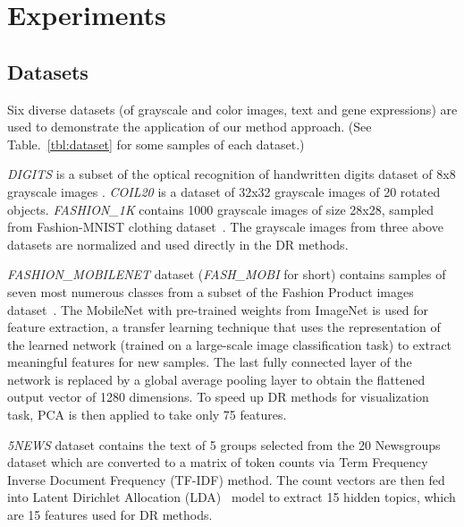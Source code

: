 \section{Experiments}\label{sec:xp:setup}


\subsection{Datasets}\label{sec:xp:data}

Six diverse datasets (of grayscale and color images, text and gene expressions) are used to demonstrate the application of our method approach. (See Table.~\ref{tbl:dataset} for some samples of each dataset.)

\emph{DIGITS} is a subset of the optical recognition of handwritten digits dataset of 8x8 grayscale images \cite{kaynak1995methods}.
\emph{COIL20} \cite{nene1996} is a dataset of 32x32 grayscale images of 20 rotated objects.
\emph{FASHION\_1K} contains 1000 grayscale images of size 28x28, sampled from Fashion-MNIST clothing dataset~\cite{xiao2017/online}.
The grayscale images from three above datasets are normalized and used directly in the DR methods.

\emph{FASHION\_MOBILENET} dataset (\emph{FASH\_MOBI} for short) contains samples of seven most numerous classes from a subset of the Fashion Product images dataset~\cite{fashionproduct}.
The MobileNet\cite{howard2017mobilenets} with pre-trained weights from ImageNet is used for feature extraction, a transfer learning technique that uses the representation of the learned network (trained on a large-scale image classification task) to extract meaningful features for new samples.
The last fully connected layer of the network is replaced by a global average pooling layer\cite[Sec.3.2]{lin2013network} to obtain the flattened output vector of 1280 dimensions.
To speed up DR methods for visualization task, PCA is then applied to take only 75 features.

\emph{5NEWS} dataset contains the text of 5 groups selected from the 20 Newsgroups dataset which are converted to a matrix of token counts via Term Frequency Inverse Document Frequency (TF-IDF) method.
The count vectors are then fed into Latent Dirichlet Allocation (LDA)~\cite{blei2003latent} model to extract 15 hidden topics, which are 15 features used for DR methods.

